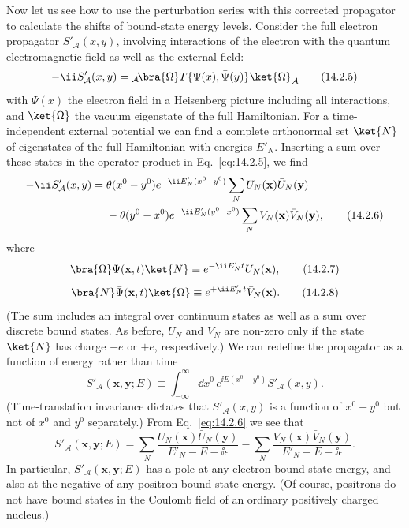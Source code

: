 Now let us see how to use the perturbation series with this corrected
propagator to calculate the shifts of bound-state energy levels. Consider the
full electron propagator $S'_{\mathcal A}(x,y)$, involving interactions of the
electron with the quantum electromagnetic field as well as the external field:
\begin{equation}
 -\ii S'_{\mathcal A}(x,y)
 ={}_{\mathcal A}\!\bra{\Omega}T\{\Psi(x),\bar\Psi(y)\}\ket{\Omega}_{\mathcal A}
 \tag{14.2.5}\label{eq:14.2.5}
\end{equation}
with $\Psi(x)$ the electron field in a Heisenberg picture including all
interactions, and $\ket{\Omega}$ the vacuum eigenstate of the full Hamiltonian.
For a time-independent external potential we can find a complete orthonormal
set $\ket{N}$ of eigenstates of the full Hamiltonian with energies $E'_N$.
Inserting a sum over these states in the operator product in
Eq.~\eqref{eq:14.2.5}, we find
\begin{align}
 -\ii S'_{\mathcal A}(x,y)={}&\theta(x^0-y^0)e^{-\ii E'_N(x^0-y^0)}
 \sum_NU_N(\mathbf x)\bar U_N(\mathbf y)
 \notag\\
 &-\theta(y^0-x^0)e^{-\ii E'_N(y^0-x^0)}
 \sum_NV_N(\mathbf x)\bar V_N(\mathbf y),
 \tag{14.2.6}\label{eq:14.2.6}
\end{align}
where
\begin{equation}
 \bra{\Omega}\Psi(\mathbf x,t)\ket{N}\equiv e^{-\ii E'_Nt}U_N(\mathbf x),
 \tag{14.2.7}\label{eq:14.2.7}
\end{equation}
\begin{equation}
 \bra{N}\bar\Psi(\mathbf x,t)\ket{\Omega}\equiv e^{+\ii E'_Nt}\bar V_N(\mathbf x).
 \tag{14.2.8}\label{eq:14.2.8}
\end{equation}
(The sum includes an integral over continuum states as well as a sum over
discrete bound states. As before, $U_N$ and $V_N$ are non-zero only if the state
$\ket{N}$ has charge $-e$ or $+e$, respectively.) We can redefine the
propagator as a function of energy rather than time
\begin{equation}
 S'_{\mathcal A}(\mathbf x,\mathbf y;E)
 \equiv\int_{-\infty}^{\infty}\dd x^0\,e^{\ii E(x^0-y^0)}S'_{\mathcal A}(x,y).
 \tag{14.2.9}\label{eq:14.2.9}
\end{equation}
(Time-translation invariance dictates that $S'_{\mathcal A}(x,y)$ is a function
of $x^0-y^0$ but not of $x^0$ and $y^0$ separately.) From
Eq.~\eqref{eq:14.2.6} we see that
\begin{equation}
 S'_{\mathcal A}(\mathbf x,\mathbf y;E)
 =\sum_N\frac{U_N(\mathbf x)\bar U_N(\mathbf y)}{E'_N-E-\ii\epsilon}
 -\sum_N\frac{V_N(\mathbf x)\bar V_N(\mathbf y)}{E'_N+E-\ii\epsilon}.
 \tag{14.2.10}\label{eq:14.2.10}
\end{equation}
In particular, $S'_{\mathcal A}(\mathbf x,\mathbf y;E)$ has a pole at any
electron bound-state energy, and also at the negative of any positron
bound-state energy. (Of course, positrons do not have bound states in the
Coulomb field of an ordinary positively charged nucleus.)

